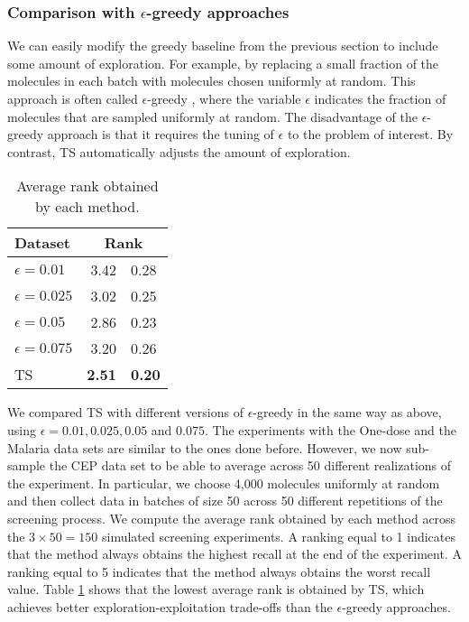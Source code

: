 \subsubsection{Comparison with $\epsilon$-greedy approaches}

We can easily modify the greedy baseline from the previous section to include some amount of exploration. For example, by replacing a small fraction of the molecules in each batch with molecules chosen uniformly at random. This approach is often called $\epsilon$-greedy \cite{watkins1989learning}, where the variable $\epsilon$ indicates the fraction of molecules that are sampled uniformly at random. The disadvantage of the $\epsilon$-greedy approach is that it requires the tuning of $\epsilon$ to the problem of interest. By contrast, TS 
automatically adjusts the amount of exploration. 

\begin{table}
\centering
\begin{tabular}{lr@{$\pm$}l}
\hline
\bf{Dataset}& \multicolumn{2}{c}{\bf{Rank}}\\
\hline
$\epsilon = 0.01$ & 3.42 & 0.28 \\
$\epsilon = 0.025$ & 3.02 & 0.25 \\
$\epsilon = 0.05$ & 2.86 & 0.23 \\
$\epsilon = 0.075$ & 3.20 & 0.26 \\
TS & \bf{2.51} & \bf{0.20} \\
\hline
\end{tabular}
\caption{Average rank obtained by each method.}\label{table1}
\end{table}

We compared TS with different versions of $\epsilon$-greedy in the same way as above, using $\epsilon = 0.01, 0.025, 0.05$ and $0.075$. The experiments with the One-dose and the Malaria data sets are similar to the ones done before. However, we now sub-sample the CEP data set to be able to average across 50 different realizations of the experiment. In particular, we choose 4,000 molecules uniformly at random and then collect data in batches of size 50 across 50 different repetitions of the screening process. We compute the average rank obtained by each method across the $3\times 50 = 150$ simulated screening experiments. A ranking equal to 1 indicates that the method always obtains the highest recall at the end of the experiment. A ranking equal to 5 indicates that the method always obtains the worst recall value. Table \ref{table1} shows that the lowest average rank is obtained by TS, which achieves better exploration-exploitation trade-offs than the $\epsilon$-greedy approaches.
